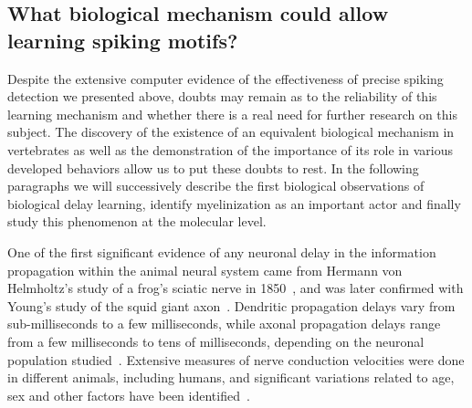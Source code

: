 \documentclass[brainsci, %
               review,submit,pdftex,moreauthors
               ]{Definitions/mdpi}
\begin{document}
\subsection{What biological mechanism could allow learning spiking motifs?}
%
Despite the extensive computer evidence of the effectiveness of precise spiking detection we presented above, doubts may remain as to the reliability of this learning mechanism and whether there is a real need for further research on this subject. The discovery of the existence of an equivalent biological mechanism in vertebrates as well as the demonstration of the importance of its role in various developed behaviors allow us to put these doubts to rest. In the following paragraphs we will successively describe the first biological observations of biological delay learning, identify myelinization as an important actor and finally study this phenomenon at the molecular level. 


One of the first significant evidence of any neuronal delay in the information propagation within the animal neural system came from Hermann von Helmholtz's study of a frog's sciatic nerve in 1850~\citep{von_helmholz_messungen_1850,peyrard_how_2020}, and was later confirmed with Young's study of the squid giant axon~\citep{young_1939}. Dendritic propagation delays vary from sub-milliseconds to a few milliseconds, while axonal propagation delays range from a few milliseconds to tens of milliseconds, depending on the neuronal population studied~\citep{madadi_asl_dendritic_2018}. Extensive measures of nerve conduction velocities were done in different animals, including humans, and significant variations related to age, sex and other factors have been identified~\citep{stetson_effects_1992}.
\end{document}
